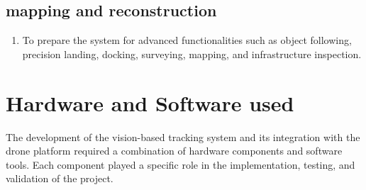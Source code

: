\documentclass[12pt]{article}
\begin{document}
{\subsection{mapping and reconstruction}
\begin{enumerate}[label=\roman*.]
\item{To prepare the system for advanced functionalities such as object following, precision landing, docking, surveying, mapping, and infrastructure inspection.}
\end{enumerate}
\newpage

\section{Hardware and Software used}
The development of the vision-based tracking system and its integration with the drone platform required a combination of hardware components and software tools. Each component played a specific role in the implementation, testing, and validation of the project.
}
\end{document}

